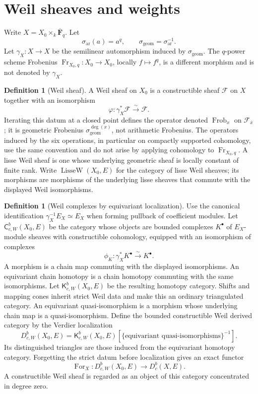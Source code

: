 \documentclass[10pt]{article}
\theoremstyle{definition}
\newtheorem{definition}[theorem]{Definition}
\newcommand{\Fbar}{\overline{\mathbf F}_q}
\newcommand{\Dbc}{D^b_c}
\newcommand{\DbcW}{D^b_{c,W}}
\newcommand{\Frob}{\operatorname{Frob}}
\begin{document}
\section{Weil sheaves and weights}

Write \(X=X_0\times_k\Fbar\).  Let
\[
 \sigma_{\mathrm{ar}}(a)=a^q,\qquad
 \sigma_{\mathrm{geom}}=\sigma_{\mathrm{ar}}^{-1}.
\]
Let \(\gamma_X:X\to X\) be the semilinear automorphism induced by
\(\sigma_{\mathrm{geom}}\).  The \(q\)-power scheme Frobenius
\(\operatorname{Fr}_{X_0,q}:X_0\to X_0\), locally \(f\mapsto f^q\), is a
different morphism and is not denoted by \(\gamma_X\).

\begin{definition}[Weil sheaf]
A Weil sheaf on \(X_0\) is a constructible sheaf \(\mathcal F\) on \(X\)
together with an isomorphism
\[
 \varphi:\gamma_X^*\mathcal F\xrightarrow{\sim}\mathcal F.
\]
Iterating this datum at a closed point defines the operator denoted
\(\Frob_x\) on \(\mathcal F_{\bar x}\); it is geometric Frobenius
\(\sigma_{\mathrm{geom}}^{\deg(x)}\), not arithmetic Frobenius.  The
 operators induced by the six operations, in particular on compactly
supported cohomology, use the same convention and do not arise by applying
cohomology to \(\operatorname{Fr}_{X_0,q}\).  A lisse Weil sheaf is one
whose underlying geometric sheaf is locally constant of finite rank.  Write
\(\operatorname{LisseW}(X_0,E)\) for the category of lisse Weil sheaves;
its morphisms are morphisms of the underlying lisse sheaves that commute
with the displayed Weil isomorphisms.
\end{definition}

\begin{definition}[Weil complexes by equivariant localization]
Use the canonical identification \(\gamma_X^{-1}E_X\simeq E_X\) when
forming pullback of coefficient modules.
Let \(\mathsf C^b_{c,W}(X_0,E)\) be the category whose objects are bounded
complexes \(K^\bullet\) of \(E_X\)-module sheaves with constructible
cohomology, equipped with an isomorphism of complexes
\[
       \phi_K:\gamma_X^*K^\bullet\xrightarrow{\sim}K^\bullet.
\]
A morphism is a chain map commuting with the displayed isomorphisms.  An
equivariant chain homotopy is a chain homotopy commuting with the same
isomorphisms.  Let \(\mathsf K^b_{c,W}(X_0,E)\) be the resulting homotopy
category.  Shifts and mapping cones inherit strict Weil data and make this
an ordinary triangulated category.  An equivariant quasi-isomorphism is a
morphism whose underlying chain map is a quasi-isomorphism.  Define the
bounded constructible Weil derived category by the Verdier localization
\[
 \DbcW(X_0,E)=
 \mathsf K^b_{c,W}(X_0,E)
 [\{\text{equivariant quasi-isomorphisms}\}^{-1}].
\]
Its distinguished triangles are those induced from the equivariant homotopy
category.  Forgetting the strict datum before localization gives an exact functor
\[
       \operatorname{For}_X:\DbcW(X_0,E)\longrightarrow\Dbc(X,E).
\]
A constructible Weil sheaf is regarded as an object of this category
concentrated in degree zero.
\end{definition}
\end{document}
